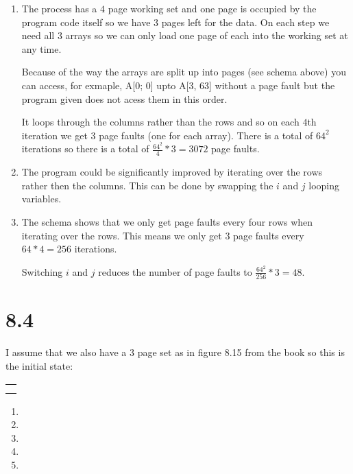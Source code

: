 \documentclass[12pt]{article}
\begin{document}
\begin{enumerate}[a]
	\item %
	The process has a $4$ page working set and one page is occupied by the program code itself so we have $3$ pages left for the data. On each step we need all $3$ arrays so we can only load one page of each into the working set at any time.

	Because of the way the arrays are split up into pages (see schema above) you can access, for exmaple, A[0; 0] upto A[3, 63] without a page fault but the program given does not acess them in this order.

	It loops through the columns rather than the rows and so on each $4$th iteration we get $3$ page faults (one for each array). There is a total of $64^2$ iterations so there is a total of $\frac{64^2}{4} * 3 = 3072$ page faults.

	\item %
	The program could be significantly improved by iterating over the rows rather then the columns. This can be done by swapping the $i$ and $j$ looping variables.

	\item %
	The schema shows that we only get page faults every four rows when iterating over the rows. This means we only get $3$ page faults every $64 * 4 = 256$ iterations.

	Switching $i$ and $j$ reduces the number of page faults to $\frac{64^2}{256} * 3 = 48$.
\end{enumerate}

\section*{8.4}
I assume that we also have a $3$ page set as in figure 8.15 from the book so this is the initial state:

\begin{tabular}{|p{2em}|}
	\hline
	\\
	\hline
	\\
	\hline
	\\
	\hline
\end{tabular}

\begin{enumerate}[a]
	\item %
	\item %
	\item %
	\item %
	\item %
\end{enumerate}
\end{document}
